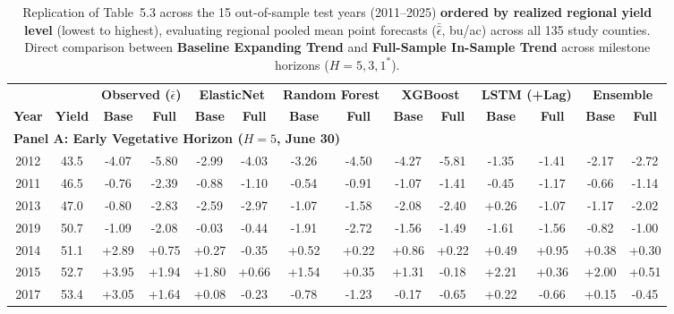 \begin{table}[htbp]
\centering
\singlespacing
\scriptsize
\setlength{\tabcolsep}{2.5pt}
\renewcommand{\arraystretch}{1.06}
\caption{Replication of Table~5.3 across the 15 out-of-sample test years (2011--2025) \textbf{ordered by realized regional yield level} (lowest to highest), evaluating regional pooled mean point forecasts ($\bar{\hat{\epsilon}}$, bu/ac) across all 135 study counties. Direct comparison between \textbf{Baseline Expanding Trend} and \textbf{Full-Sample In-Sample Trend} across milestone horizons ($H = 5, 3, 1^*$).}
\label{tab:yearly_ordered_yield_performance}
\begin{tabular*}{\textwidth}{@{\extracolsep{\fill}} c c cc cc cc cc cc cc @{}}
\toprule
& & \multicolumn{2}{c}{\textbf{Observed ($\bar{\epsilon}$)}} & \multicolumn{2}{c}{\textbf{ElasticNet}} & \multicolumn{2}{c}{\textbf{Random Forest}} & \multicolumn{2}{c}{\textbf{XGBoost}} & \multicolumn{2}{c}{\textbf{LSTM (+Lag)}} & \multicolumn{2}{c}{\textbf{Ensemble}} \\
\cmidrule(lr){3-4}\cmidrule(lr){5-6}\cmidrule(lr){7-8}\cmidrule(lr){9-10}\cmidrule(lr){11-12}\cmidrule(lr){13-14}
\textbf{Year} & \textbf{Yield} & \textbf{Base} & \textbf{Full} & \textbf{Base} & \textbf{Full} & \textbf{Base} & \textbf{Full} & \textbf{Base} & \textbf{Full} & \textbf{Base} & \textbf{Full} & \textbf{Base} & \textbf{Full} \\
\midrule
\multicolumn{14}{l}{\textbf{Panel A: Early Vegetative Horizon ($H=5$, June 30)}} \\
2012 & 43.5 & -4.07 & -5.80 & -2.99 & -4.03 & -3.26 & -4.50 & -4.27 & -5.81 & -1.35 & -1.41 & -2.17 & -2.72 \\
2011 & 46.5 & -0.76 & -2.39 & -0.88 & -1.10 & -0.54 & -0.91 & -1.07 & -1.41 & -0.45 & -1.17 & -0.66 & -1.14 \\
2013 & 47.0 & -0.80 & -2.83 & -2.59 & -2.97 & -1.07 & -1.58 & -2.08 & -2.40 & +0.26 & -1.07 & -1.17 & -2.02 \\
2019 & 50.7 & -1.09 & -2.08 & -0.03 & -0.44 & -1.91 & -2.72 & -1.56 & -1.49 & -1.61 & -1.56 & -0.82 & -1.00 \\
2014 & 51.1 & +2.89 & +0.75 & +0.27 & -0.35 & +0.52 & +0.22 & +0.86 & +0.22 & +0.49 & +0.95 & +0.38 & +0.30 \\
2015 & 52.7 & +3.95 & +1.94 & +1.80 & +0.66 & +1.54 & +0.35 & +1.31 & -0.18 & +2.21 & +0.36 & +2.00 & +0.51 \\
2017 & 53.4 & +3.05 & +1.64 & +0.08 & -0.23 & -0.78 & -1.23 & -0.17 & -0.65 & +0.22 & -0.66 & +0.15 & -0.45 \\

\end{tabular*}
\end{table}

